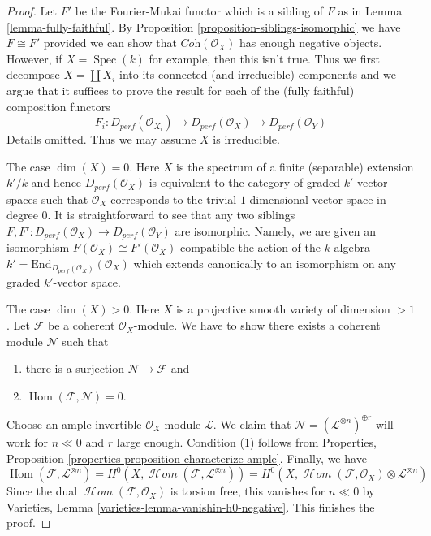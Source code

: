 \documentclass{stacks-project}
\theoremstyle{plain}
\theoremstyle{definition}
\theoremstyle{remark}
\numberwithin{equation}{subsection}
\def\Spec{\mathop{\mathrm{Spec}}}
\def\Hom{\mathop{\mathrm{Hom}}\nolimits}
\def\SheafHom{\mathop{\mathcal{H}\!\mathit{om}}\nolimits}
\begin{document}
\begin{proof}
Let $F'$ be the Fourier-Mukai functor which is a sibling of $F$
as in Lemma \ref{lemma-fully-faithful}.
By Proposition \ref{proposition-siblings-isomorphic} we have $F \cong F'$
provided we can show that $\textit{Coh}(\mathcal{O}_X)$ has enough
negative objects. However, if $X = \Spec(k)$ for example, then
this isn't true. Thus we first decompose $X = \coprod X_i$
into its connected (and irreducible) components and we
argue that it suffices to prove the result for each of the
(fully faithful) composition functors
$$
F_i :
D_{perf}(\mathcal{O}_{X_i}) \to
D_{perf}(\mathcal{O}_X) \to
D_{perf}(\mathcal{O}_Y)
$$
Details omitted. Thus we may assume $X$ is irreducible.

\medskip\noindent
The case $\dim(X) = 0$. Here $X$ is the spectrum of a finite (separable)
extension $k'/k$ and hence $D_{perf}(\mathcal{O}_X)$
is equivalent to the category
of graded $k'$-vector spaces such that $\mathcal{O}_X$ corresponds to the
trivial $1$-dimensional vector space in degree $0$.
It is straightforward to see that any two
siblings $F, F' : D_{perf}(\mathcal{O}_X) \to D_{perf}(\mathcal{O}_Y)$
are isomorphic. Namely, we are given an isomorphism
$F(\mathcal{O}_X) \cong F'(\mathcal{O}_X)$
compatible the action of the $k$-algebra
$k' = \text{End}_{D_{perf}(\mathcal{O}_X)}(\mathcal{O}_X)$
which extends canonically to an isomorphism on any graded $k'$-vector space.

\medskip\noindent
The case $\dim(X) > 0$. Here $X$ is a projective smooth
variety of dimension $> 1$. Let $\mathcal{F}$ be a coherent
$\mathcal{O}_X$-module. We have to show there exists a
coherent module $\mathcal{N}$ such that
\begin{enumerate}
\item there is a surjection $\mathcal{N} \to \mathcal{F}$ and
\item $\Hom(\mathcal{F}, \mathcal{N}) = 0$.
\end{enumerate}
Choose an ample invertible $\mathcal{O}_X$-module $\mathcal{L}$.
We claim that $\mathcal{N} = (\mathcal{L}^{\otimes n})^{\oplus r}$
will work for $n \ll 0$ and $r$ large enough.
Condition (1) follows from
Properties, Proposition \ref{properties-proposition-characterize-ample}.
Finally, we have
$$
\Hom(\mathcal{F}, \mathcal{L}^{\otimes n}) =
H^0(X, \SheafHom(\mathcal{F}, \mathcal{L}^{\otimes n})) =
H^0(X, \SheafHom(\mathcal{F}, \mathcal{O}_X) \otimes \mathcal{L}^{\otimes n})
$$
Since the dual $\SheafHom(\mathcal{F}, \mathcal{O}_X)$ is torsion free, this
vanishes for $n \ll 0$ by Varieties, Lemma 
\ref{varieties-lemma-vanishin-h0-negative}. This finishes the proof.
\end{proof}
\end{document}
